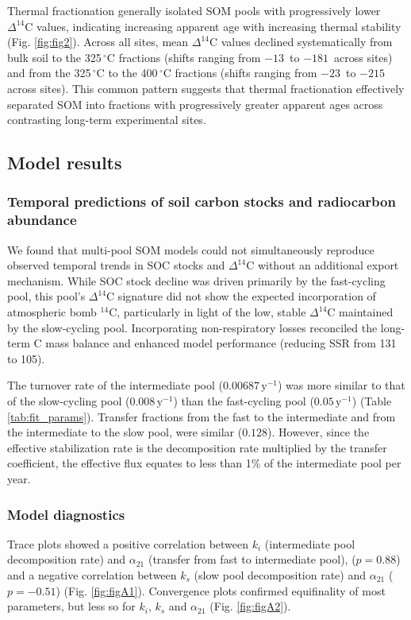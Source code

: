 \documentclass[bg, manuscript]{copernicus}
\begin{document}
Thermal fractionation generally isolated SOM pools with progressively lower $\Delta^{14}\text{C}$ values, indicating increasing apparent age with increasing thermal stability (Fig. \ref{fig:fig2}). Across all sites, mean $\Delta^{14}\text{C}$ values declined systematically from bulk soil to the 325\,$^\circ\text{C}$ fractions (shifts ranging from $-13$\,\permil{} to $-181$\,\permil{} across sites) and from the 325\,$^\circ\text{C}$ to the 400\,$^\circ\text{C}$ fractions (shifts ranging from $-23$\,\permil{} to $-215$\,\permil{} across sites). This common pattern suggests that thermal fractionation effectively separated SOM into fractions with progressively greater apparent ages across contrasting long-term experimental sites.

\subsection{Model results}

\subsubsection{Temporal predictions of soil carbon stocks and radiocarbon abundance}
We found that multi-pool SOM models could not simultaneously reproduce observed temporal trends in SOC stocks and $\Delta^{14}\text{C}$ without an additional export mechanism. While SOC stock decline was driven primarily by the fast-cycling pool, this pool’s $\Delta^{14}\text{C}$ signature did not show the expected incorporation of atmospheric bomb $^{14}\text{C}$, particularly in light of the low, stable $\Delta^{14}\text{C}$ maintained by the slow-cycling pool. Incorporating non-respiratory losses reconciled the long-term C mass balance and enhanced model performance (reducing SSR from 131 to 105).

The turnover rate of the intermediate pool ($0.00687\,\text{y}^{-1}$) was more similar to that of the slow-cycling pool ($0.008\,\text{y}^{-1}$) than the fast-cycling pool ($0.05\,\text{y}^{-1}$) (Table \ref{tab:fit_params}). Transfer fractions from the fast to the intermediate and from the intermediate to the slow pool, were similar ($0.128$). However, since the effective stabilization rate is the decomposition rate multiplied by the transfer coefficient, the effective flux equates to less than 1\% of the intermediate pool per year.

\subsubsection{Model diagnostics}
Trace plots showed a positive correlation between $k_i$ (intermediate pool decomposition rate) and $\alpha_{21}$ (transfer from fast to intermediate pool), ($p = 0.88$) and a negative correlation between $k_s$ (slow pool decomposition rate) and $\alpha_{21}$ ($p = -0.51$) (Fig. \ref{fig:figA1}). Convergence plots confirmed equifinality of most parameters, but less so for $k_i$, $k_s$ and $\alpha_{21}$ (Fig. \ref{fig:figA2}).
\end{document}
